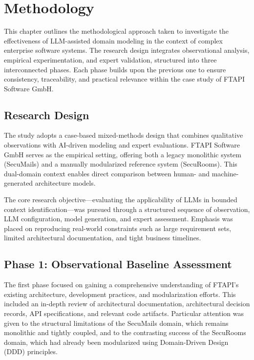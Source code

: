 \chapter{Methodology}

This chapter outlines the methodological approach taken to investigate the effectiveness of LLM-assisted domain modeling in the context of complex enterprise software systems. The research design integrates observational analysis, empirical experimentation, and expert validation, structured into three interconnected phases. Each phase builds upon the previous one to ensure consistency, traceability, and practical relevance within the case study of FTAPI Software GmbH.

\section{Research Design}

The study adopts a case-based mixed-methods design that combines qualitative observations with AI-driven modeling and expert evaluations. FTAPI Software GmbH serves as the empirical setting, offering both a legacy monolithic system (SecuMails) and a manually modularized reference system (SecuRooms). This dual-domain context enables direct comparison between human- and machine-generated architecture models.

The core research objective—evaluating the applicability of LLMs in bounded context identification—was pursued through a structured sequence of observation, LLM configuration, model generation, and expert assessment. Emphasis was placed on reproducing real-world constraints such as large requirement sets, limited architectural documentation, and tight business timelines.

\section{Phase 1: Observational Baseline Assessment}

The first phase focused on gaining a comprehensive understanding of FTAPI's existing architecture, development practices, and modularization efforts. This included an in-depth review of architectural documentation, architectural decision records, API specifications, and relevant code artifacts. Particular attention was given to the structural limitations of the SecuMails domain, which remains monolithic and tightly coupled, and to the contrasting success of the SecuRooms domain, which had already been modularized using Domain-Driven Design (DDD) principles.

